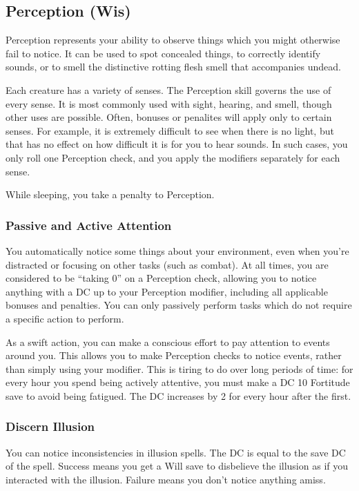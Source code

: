 \subsection{Perception (Wis)}\label{Perception}
Perception represents your ability to observe things which you might otherwise fail to notice. It can be used to spot concealed things, to correctly identify sounds, or to smell the distinctive rotting flesh smell that accompanies undead.

Each creature has a variety of senses. The Perception skill governs the use of every sense. It is most commonly used with sight, hearing, and smell, though other uses are possible. Often, bonuses or penalites will apply only to certain senses. For example, it is extremely difficult to see when there is no light, but that has no effect on how difficult it is for you to hear sounds. In such cases, you only roll one Perception check, and you apply the modifiers separately for each sense. 

While sleeping, you take a  penalty to Perception.

\subsubsection{Passive and Active Attention}\label{Perception:Passive and Active Attention}
You automatically notice some things about your environment, even when you're distracted or focusing on other tasks (such as combat). At all times, you are considered to be ``taking 0'' on a Perception check, allowing you to notice anything with a DC up to your Perception modifier, including all applicable bonuses and penalties. You can only passively perform tasks which do not require a specific action to perform.

As a swift action, you can make a conscious effort to pay attention to events around you. This allows you to make Perception checks to notice events, rather than simply using your modifier. This is tiring to do over long periods of time: for every hour you spend being actively attentive, you must make a DC 10 Fortitude save to avoid being fatigued. The DC increases by 2 for every hour after the first.

\subsubsection{Discern Illusion}
You can notice inconsistencies in illusion spells. The DC is equal to the save DC of the spell. Success means you get a Will save to disbelieve the illusion as if you interacted with the illusion. Failure means you don't notice anything amiss.

